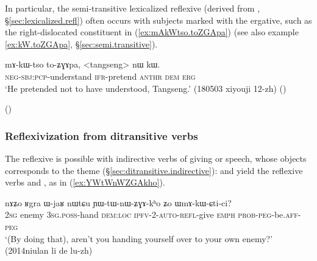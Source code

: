 In particular, the semi-transitive lexicalized reflexive  (derived from , §\ref{sec:lexicalized.refl}) often occurs with subjects marked with the ergative, such as the right-dislocated constituent  in (\ref{ex:mAkWtso.toZGApa})  (see also example \ref{ex:kW.toZGApa}, §\ref{sec:semi.transitive}).
 
 \begin{exe}
\ex \label{ex:mAkWtso.toZGApa}
 \gll  mɤ-kɯ-tso to-ʑɣɤpa, <tangseng> nɯ kɯ. \\
 \textsc{neg}-\textsc{sbj}:\textsc{pcp}-understand \textsc{ifr}-pretend  \textsc{anthr} \textsc{dem} \textsc{erg} \\
 \glt  `He pretended not to have understood, Tangseng.' (180503 xiyouji 12-zh)
()
 \end{exe}
% 
()
 
  \subsubsection{Reflexivization from ditransitive verbs} \label{sec:refl.ditransitive}
The reflexive is possible with indirective verbs of giving or speech, whose objects corresponds to the theme (§\ref{sec:ditransitive.indirective}):  and  yield the reflexive verbs  and , as in (\ref{ex:YWtWnWZGAkho}). 

\begin{exe}
\ex \label{ex:YWtWnWZGAkho}
 \gll nɤʑo ʁgra ɯ-jaʁ nɯtɕu ɲɯ-tɯ-nɯ-ʑɣɤ-kʰo ʑo ɯmɤ-kɯ-ɕti-ci? \\
 \textsc{2sg} enemy \textsc{3sg}.\textsc{poss}-hand \textsc{dem}:\textsc{loc} \textsc{ipfv}-2-\textsc{auto}-\textsc{refl}-give \textsc{emph} \textsc{prob}-\textsc{peg}-be.\textsc{aff}-\textsc{peg} \\
 \glt `(By doing that), aren't you handing yourself over to your own enemy?' (2014niulan li de lu-zh)
 \end{exe}
 
